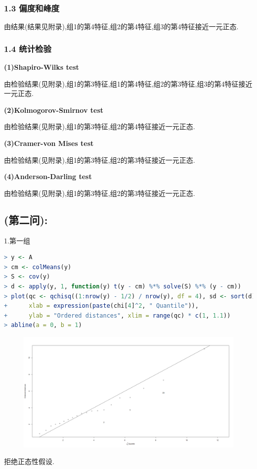 \documentclass[11pt,a4paper]{ctexart}
\begin{document}
\subsubsection*{1.3 偏度和峰度}

由结果(结果见附录),组1的第4特征,组2的第4特征,组3的第4特征接近一元正态.

\subsubsection*{1.4 统计检验}
\textbf{(1)Shapiro-Wilks test}


由检验结果(见附录),组1的第3特征,组1的第4特征,组2的第3特征,组3的第4特征接近一元正态.

\textbf{(2)Kolmogorov-Smirnov test}


由检验结果(见附录),组1的第3特征,组2的第4特征接近一元正态.

\textbf{(3)Cramer-von Mises test}

由检验结果(见附录),组1的第3特征,组2的第3特征接近一元正态.

\textbf{(4)Anderson-Darling test}

由检验结果(见附录),组1的第3特征,组2的第3特征接近一元正态.


\subsection*{(第二问):}

1.第一组

\begin{lstlisting}[language=r]
> y <- A
> cm <- colMeans(y)
> S <- cov(y)
> d <- apply(y, 1, function(y) t(y - cm) %*% solve(S) %*% (y - cm))
> plot(qc <- qchisq((1:nrow(y) - 1/2) / nrow(y), df = 4), sd <- sort(d),
+      xlab = expression(paste(chi[4]^2, " Quantile")),
+      ylab = "Ordered distances", xlim = range(qc) * c(1, 1.1))
> abline(a = 0, b = 1)
\end{lstlisting}
\begin{figure}[H]
	\centering
	\includegraphics[width=\textwidth]{10.png}
\end{figure}
拒绝正态性假设.\\
\end{document}
